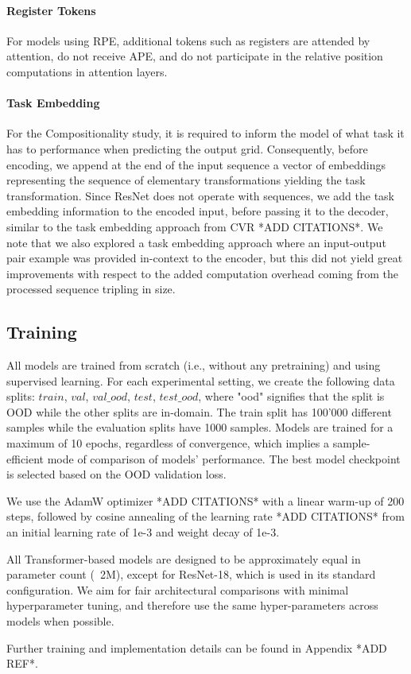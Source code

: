 \paragraph{Register Tokens}
 For models using RPE, additional tokens such as registers are attended by attention, do not receive APE, and do not participate in the relative position computations in attention layers.

\paragraph{Task Embedding}
For the Compositionality study, it is required to inform the model of what task it has to performance when predicting the output grid. Consequently, before encoding, we append at the end of the input sequence a vector of embeddings representing the sequence of elementary transformations yielding the task transformation.
Since ResNet does not operate with sequences, we add the task embedding information to the encoded input, before passing it to the decoder, similar to the task embedding approach from CVR *ADD CITATIONS*.
We note that we also explored a task embedding approach where an input-output pair example was provided in-context to the encoder, but this did not yield great improvements with respect to the added computation overhead coming from the processed sequence tripling in size.


\subsection{Training}

All models are trained from scratch (i.e., without any pretraining) and using supervised learning. For each experimental setting, we create the following data splits: $train$, $val$, $val\_ood$, $test$, $test\_ood$, where "ood" signifies that the split is OOD while the other splits are in-domain. The train split has 100'000 different samples while the evaluation splits have 1000 samples. Models are trained for a maximum of 10 epochs, regardless of convergence, which implies a sample-efficient mode of comparison of models' performance. The best model checkpoint is selected based on the OOD validation loss.

We use the AdamW optimizer *ADD CITATIONS* with a linear warm-up of 200 steps, followed by cosine annealing of the learning rate *ADD CITATIONS* from an initial learning rate of 1e-3 and weight decay of 1e-3.

All Transformer-based models are designed to be approximately equal in parameter count (~2M), except for ResNet-18, which is used in its standard configuration. We aim for fair architectural comparisons with minimal hyperparameter tuning, and therefore use the same hyper-parameters across models when possible. 


Further training and implementation details can be found in Appendix *ADD REF*.
